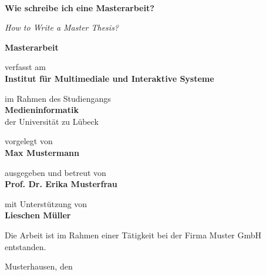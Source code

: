 
\begin{titlepage}
  \thispagestyle{empty}

  \vskip1cm

  \begin{center}
    \\
    \bigskip
  \end{center}
  
  \begin{center}

    \vskip2.5cm
    
    \LARGE
    
    \textbf{\sffamily\color{maincolor}Wie schreibe ich eine Masterarbeit?}

    \textit{\color{maincolor}How to Write a Master Thesis?}

    \normalfont\normalsize
    \bigskip
    \bigskip

    \textbf{\sffamily\color{maincolor}Masterarbeit}

    \bigskip

    verfasst am \\
    \textbf{\sffamily\color{maincolor}Institut für Multimediale und Interaktive Systeme} \\

    \bigskip

    im Rahmen des Studiengangs \\
    \textbf{\sffamily\color{maincolor}Medieninformatik} \\
    der Universität zu Lübeck

    \bigskip

    vorgelegt von \\
    \textbf{\sffamily\color{maincolor}Max Mustermann} \\

    \bigskip
    
    ausgegeben und betreut von \\
    \textbf{\sffamily\color{maincolor}Prof. Dr. Erika Musterfrau}

    \bigskip

    mit Unterstützung von\\
    \textbf{\sffamily\color{maincolor}Lieschen Müller}

    \bigskip

    Die Arbeit ist im Rahmen einer Tätigkeit bei der Firma Muster GmbH entstanden.


    \vfill

    Musterhausen, den \duedate

  \end{center}
\end{titlepage}
